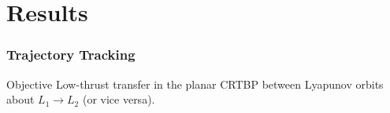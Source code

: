 \section{Results}

\begin{frame}
  \frametitle{Trajectory Tracking}
  \vspace{-0.3cm}
  \begin{minipage}
        {\textwidth}
  \begin{alertblock}{Objective}
    Low-thrust transfer in the planar CRTBP between Lyapunov orbits about $L_1 \rightarrow L_2$ (or vice versa).
  \end{alertblock}
  \end{minipage}
  \vspace{0.3cm}
  \begin{columns}[T]
    \begin{column}{0.52\textwidth}


\end{column}
\end{columns}
\end{frame}
